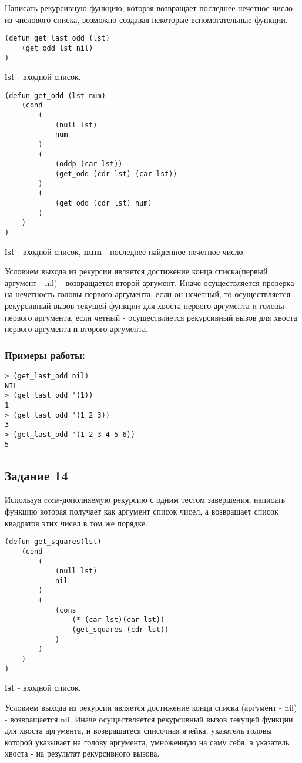 \documentclass[a4paper,12pt]{article}
\begin{document}
Написать рекурсивную функцию, которая возвращает последнее нечетное число из числового списка, возможно создавая некоторые вспомогательные функции.

\begin{lstlisting}[caption=Функция-обертка для получения последнего нечетного числа]
(defun get_last_odd (lst)
	(get_odd lst nil)
)
\end{lstlisting}
\textbf{lst} - входной список.
\begin{lstlisting}[caption=Функция получения последнего нечетного числа]
(defun get_odd (lst num)
	(cond	
		(
			(null lst) 
			num
		)
		(
			(oddp (car lst))
			(get_odd (cdr lst) (car lst))
		)
		(
			(get_odd (cdr lst) num)
		)
	)
)
\end{lstlisting}
\textbf{lst} - входной список, \textbf{num} - последнее найденное нечетное число.

Условием выхода из рекурсии является достижение конца списка(первый аргумент - nil) - возвращается второй аргумент. Иначе осуществляется проверка на нечетность головы первого аргумента, если он нечетный, то осуществляется рекурсивный вызов текущей функции для хвоста первого аргумента и головы первого аргумента, если четный - осуществляется рекурсивный вызов для хвоста первого аргумента и второго аргумента.
\subsubsection*{Примеры работы:}
\begin{lstlisting}
> (get_last_odd nil)
NIL
> (get_last_odd '(1))
1
> (get_last_odd '(1 2 3))
3
> (get_last_odd '(1 2 3 4 5 6))
5
\end{lstlisting}

\subsection*{Задание 14}

Используя cons-дополняемую рекурсию с одним тестом завершения, написать функцию которая получает как аргумент список чисел, а возвращает список квадратов этих чисел в том же порядке. 
\begin{lstlisting}[caption=Функция получения квадратов чисел из списка]
(defun get_squares(lst)
	(cond
		(
			(null lst)
			nil
		)
		(
			(cons  
				(* (car lst)(car lst)) 
				(get_squares (cdr lst))
			)
		)
	)
)
\end{lstlisting}
\textbf{lst} - входной список.

Условием выхода из рекурсии является достижение конца списка (аргумент -  nil) - возвращается nil. Иначе осуществляется рекурсивный вызов текущей функции для хвоста аргумента, и возвращатеся списочная ячейка, указатель головы которой указывает на голову аргумента, умноженную на саму себя, а указатель хвоста - на результат рекурсивного вызова.
\end{document}
